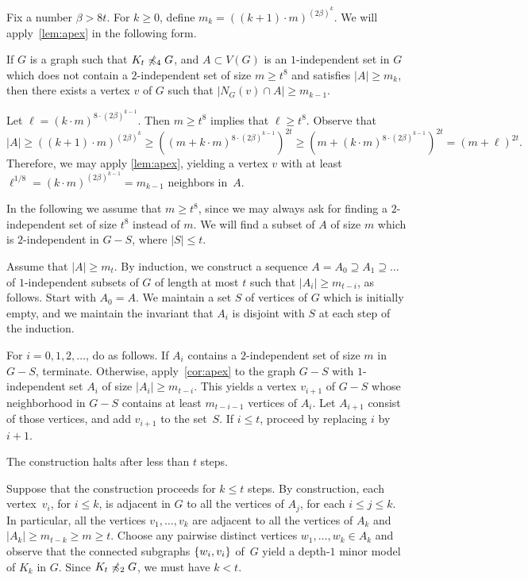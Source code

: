 \newcommand{\mbull}{\widehat{m}}

Fix a number $\beta>8t$. For $k\ge 0$,
define $m_k=((k+1)\cdot m)^{(2\beta)^k}$.
We will apply~\cref{lem:apex} in the following form.
\begin{claim}\label{cor:apex}
	If $G$ is a graph such that $K_t\not\preccurlyeq_4 G$, and
	$A\subset V(G)$ is an $1$-independent set in $G$ which does not contain a $2$-independent set of size $m\geq t^8$ and satisfies $|A|\ge m_k$,
	then there exists a vertex $v$ of $G$ such that $|N_G(v)\cap A| \ge m_{k-1}$.
\end{claim}
\begin{clproof}
Let $\ell=(k\cdot m)^{8\cdot(2\beta)^{k-1}}$.
Then $m\ge t^8$ implies that $\ell\ge t^8$.
Observe that
\[|A|\ge \left((k+1)\cdot m\right)^{(2\beta)^k}\ge\left ((m+ k\cdot m)^{8\cdot(2\beta)^{k-1}} \right)^{2t}
\ge \left(m+(k\cdot m)^{8\cdot (2\beta)^{k-1}}\right)^{2t}=(m+\ell)^{2t}.\]
Therefore, we may  apply \cref{lem:apex}, yielding a vertex $v$ with at least $\ell^{1/8}=(k\cdot m)^{(2\beta)^{k-1}}=m_{k-1}$ neighbors in~$A$.
\end{clproof}

In the following we assume that $m\geq t^8$, since we may always ask for finding a $2$-independent set of size $t^8$ instead of $m$.
We will find 
a subset of $A$ of size $m$ which is $2$-independent in $G-S$, where $|S|\le t$.


Assume that $|A|\ge m_t$. By induction, we
 construct a sequence  $A=A_0\supseteq A_1\supseteq\ldots$ 
of $1$-independent subsets of $G$
of length at most $t$
such that $|A_i|\ge m_{t-i}$,
 as follows. Start with $A_0=A$. We maintain a set $S$ of vertices of $G$ which is initially empty, and we maintain the invariant that $A_i$ is disjoint with $S$ at each step of the induction.

For $i=0,1,2,\ldots$, do as follows.
If $A_{i}$ contains a $2$-independent set of size $m$ in $G-S$, terminate.
 Otherwise, 
 apply~\cref{cor:apex} to the graph $G-S$ with $1$-independent set
 $A_{i}$ of size $|A_i|\ge m_{t-i}$. This yields a vertex $v_{i+1}$ of $G-S$
 whose neighborhood in $G-S$ contains at least
 $m_{t-i-1}$ vertices of $A_{i}$.
 Let $A_{i+1}$ consist of those vertices, and add $v_{i+1}$
 to the set~$S$.  
  If $i\le t$, proceed by replacing $i$ by $i+1$.

\begin{claim}\label{claim:at-most-t}
	The construction halts after less than $t$ steps.
\end{claim}
\begin{clproof}
Suppose that the construction proceeds for $k\le t$ steps.
By construction, each vertex~$v_i$, for $i\le k$, is adjacent in $G$
 to all the vertices of $A_{j}$, for each $i\le j\le k$. In particular, all the vertices $v_1,\ldots,v_k$ are adjacent to all the vertices of $A_{k}$
 and $|A_k|\ge m_{t-k}\ge m\ge t$.
Choose any pairwise distinct vertices $w_1,\ldots,w_k\in A_k$ and observe that the connected subgraphs $\{w_i,v_i\}$ of~$G$ yield a depth-$1$ minor model of $K_k$ in $G$.
 Since $K_t\not\preccurlyeq_2 G$, we must have $k<t$.
 \end{clproof}
 
